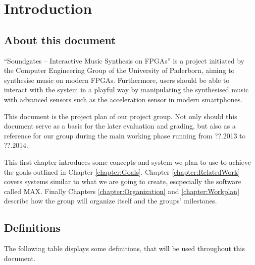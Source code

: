 \chapter{Introduction}
	\label{chapter:Introduction}
	\section{About this document}
	
"`Soundgates – Interactive Music Synthesis on FPGAs"' is a project initiated by the Computer Engineering Group of the University of Paderborn, aiming to synthesise music on modern FPGAs. 
Furthermore, users should be able to interact with the system in a playful way by manipulating the synthesised music with advanced sensors such as the acceleration sensor in modern smartphones.


This document is the project plan of our project group.
Not only should this document serve as a basis for the later evaluation and grading, 
but also as a reference for our group during the main working phase running from ??.2013 to ??.2014.

This first chapter introduces some concepts and system we plan to use to achieve the goals outlined in Chapter \ref{chapter:Goals}. 
Chapter \ref{chapter:RelatedWork} covers systems similar to what we are going to create, escpecially the software called MAX.	
Finally Chapters \ref{chapter:Organization} and \ref{chapter:Workplan} describe how the group will organize itself and the groups' milestones.

	\section{Definitions}
	 The following table displays some definitions, that will be used throughout this document.\\
	
	 
